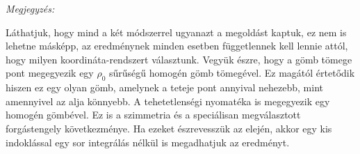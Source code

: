  \newpage
 \emph{Megjegyzés:}
 
 Láthatjuk, hogy mind a két módszerrel ugyanazt a megoldást kaptuk, ez nem is lehetne másképp, az eredménynek minden esetben függetlennek kell lennie attól, hogy milyen koordináta-rendszert választunk. Vegyük észre, hogy a gömb tömege pont megegyezik egy $\rho_0$ sűrűségű homogén gömb tömegével. Ez magától értetődik hiszen ez egy olyan gömb, amelynek a teteje pont annyival nehezebb, mint amennyivel az alja könnyebb. A tehetetlenségi nyomatéka is megegyezik egy homogén gömbével. Ez is a szimmetria és a speciálisan megválasztott forgástengely következménye. Ha ezeket észrevesszük az elején, akkor egy kis indoklással egy sor integrálás nélkül is megadhatjuk az eredményt. 

\fi